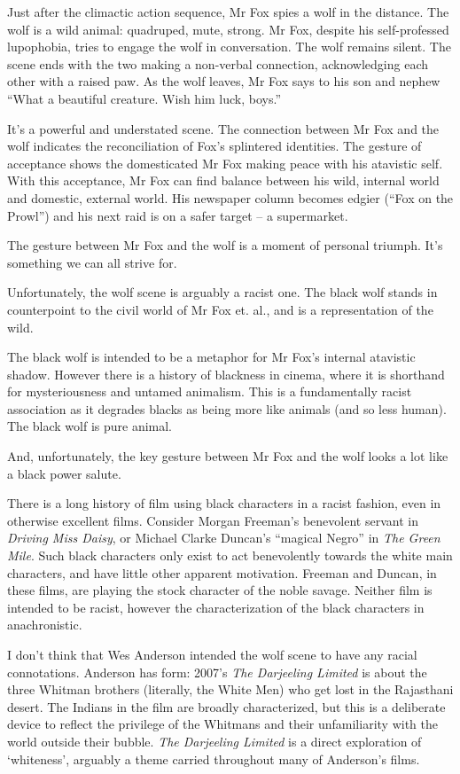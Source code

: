 Just after the climactic action sequence, Mr Fox spies a wolf in the distance. The wolf is a wild animal: quadruped, mute, strong. Mr Fox, despite his self-professed lupophobia, tries to engage the wolf in conversation. The wolf remains silent. The scene ends with the two making a non-verbal connection, acknowledging each other with a raised paw. As the wolf leaves, Mr Fox says to his son and nephew ``What a beautiful creature. Wish him luck, boys.''

It's a powerful and understated scene. The connection between Mr Fox and the wolf indicates the reconciliation of Fox's splintered identities. The gesture of acceptance shows the domesticated Mr Fox making peace with his atavistic self. With this acceptance, Mr Fox can find balance between his wild, internal world and domestic, external world. His newspaper column becomes edgier (``Fox on the Prowl'') and his next raid is on a safer target – a supermarket.

The gesture between Mr Fox and the wolf is a moment of personal triumph. It's something we can all strive for.

Unfortunately, the wolf scene is arguably a racist one. The black wolf stands in counterpoint to the civil world of Mr Fox et. al., and is a representation of the wild.

The black wolf is intended to be a metaphor for Mr Fox's internal atavistic shadow. However there is a history of blackness in cinema, where it is shorthand for mysteriousness and untamed animalism. This is a fundamentally racist association as it degrades blacks as being more like animals (and so less human). The black wolf is pure animal.

And, unfortunately, the key gesture between Mr Fox and the wolf looks a lot like a black power salute.

There is a long history of film using black characters in a racist fashion, even in otherwise excellent films. Consider Morgan Freeman's benevolent servant in \textit{Driving Miss Daisy}, or Michael Clarke Duncan's ``magical Negro'' in \textit{The Green Mile}. Such black characters only exist to act benevolently towards the white main characters, and have little other apparent motivation. Freeman and Duncan, in these films, are playing the stock character of the noble savage. Neither film is intended to be racist, however the characterization of the black characters in anachronistic.

I don't think that Wes Anderson intended the wolf scene to have any racial connotations. Anderson has form: 2007's \textit{The Darjeeling Limited} is about the three Whitman brothers (literally, the White Men) who get lost in the Rajasthani desert. The Indians in the film are broadly characterized, but this is a deliberate device to reflect the privilege of the Whitmans and their unfamiliarity with the world outside their bubble. \textit{The Darjeeling Limited} is a direct exploration of ‘whiteness', arguably a theme carried throughout many of Anderson's films.

